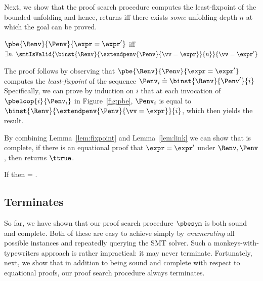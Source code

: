 %
Next, we show that the proof search procedure \pbesym computes
the least-fixpoint of the bounded unfolding and hence,
returns \ttrue iff there exists \emph{some} unfolding
depth $n$ at which the goal can be proved.

\begin{lemma}\label{lem:fixpoint}
$\pbe{\Renv}{\Penv}{\expr = \expr'}$ iff
$\exists n.\ \smtIsValid{\binst{\Renv}{\extendpenv{\Penv}{\vv = \expr}}{n}}{\vv = \expr'}$
\end{lemma}

The proof follows by observing that
$\pbe{\Renv}{\Penv}{\expr = \expr'}$
computes the \emph{least-fixpoint}
of the sequence
%
$\Penv_i \doteq \binst{\Renv}{\Penv'}{i} \label{eq:fix:1}$
%
Specifically, we can prove by induction on $i$
that at each invocation of $\pbeloop{i}{\Penv_i}$
in Figure~\ref{fig:pbe}, $\Penv_i$ is equal to
$\binst{\Renv}{\extendpenv{\Penv}{\vv = \expr}}{i}$,
which then yields the result.

%
By combining Lemma~\ref{lem:fixpoint}
and  Lemma~\ref{lem:link}  we can show that
\pbesym is complete, \ie if there is an equational proof
that $\expr = \expr'$ under $\Renv, \Penv$,
then  returns $\ttrue$.

\begin{theorem} \label{thm:completeness}
  If 
  then  = \ttrue.
\end{theorem}

\subsection{\pbesym Terminates} \label{sec:pbe:terminates}


So far, we have shown that our proof search
procedure $\pbesym$ is both sound and complete.
%
Both of these are easy to achieve
simply by \emph{enumerating} all
possible instances and repeatedly
querying the SMT solver.
%
Such a monkeys-with-typewriters
approach is rather impractical: it
may never terminate.
%
Fortunately, next, we show that in
addition to being sound and complete
with respect to equational proofs,
our proof search procedure always
terminates.

